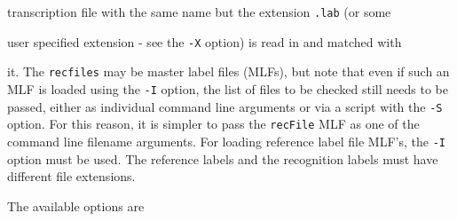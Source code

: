 transcription file with the same name but the extension {\tt .lab} (or some


user specified extension - see the {\tt -X} option) is read in and matched with


it. The {\tt recfiles} may be master label files (MLFs), but note that even if  such an MLF is loaded using the {\tt -I} option, the list of files to be checked still needs to be passed, either as individual command line arguments or via a script with the {\tt -S} option. For this reason, it is simpler to pass the {\tt recFile} MLF as one of the command line filename arguments. For loading reference label file MLF's, the {\tt -I} option must be used. The reference labels and the recognition labels must have different file extensions.


The available options are


